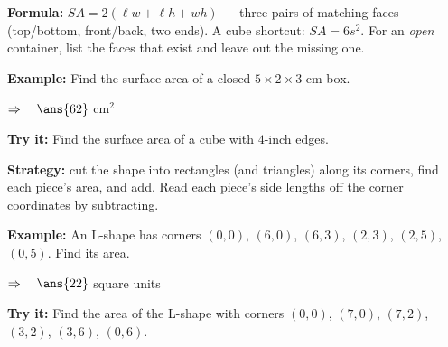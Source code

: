 \documentclass[12pt]{article}
\begin{document}


\begin{formulabox}
\textbf{Formula:} $SA = 2(\ell w + \ell h + wh)$ --- three pairs of matching
faces (top/bottom, front/back, two ends). A cube shortcut: $SA = 6s^2$. For an
\emph{open} container, list the faces that exist and leave out the missing one.
\end{formulabox}

\begin{examplebox}
\textbf{Example:} \quad Find the surface area of a closed $5 \times 2 \times 3$
cm box.

$\Rightarrow\quad \ans{62}$ cm$^2$
\end{examplebox}

\begin{tryitbox}
\textbf{Try it:} \quad Find the surface area of a cube with $4$-inch
edges.\\[2pt]
\end{tryitbox}


\begin{formulabox}
\textbf{Strategy:} cut the shape into rectangles (and triangles) along its
corners, find each piece's area, and add. Read each piece's side lengths off
the corner coordinates by subtracting.
\end{formulabox}

\begin{examplebox}
\textbf{Example:} \quad An L-shape has corners $(0,0)$, $(6,0)$, $(6,3)$,
$(2,3)$, $(2,5)$, $(0,5)$. Find its area.

$\Rightarrow\quad \ans{22}$ square units
\end{examplebox}

\begin{tryitbox}
\textbf{Try it:} \quad Find the area of the L-shape with corners $(0,0)$,
$(7,0)$, $(7,2)$, $(3,2)$, $(3,6)$, $(0,6)$.\\[2pt]
\end{tryitbox}
\end{document}

